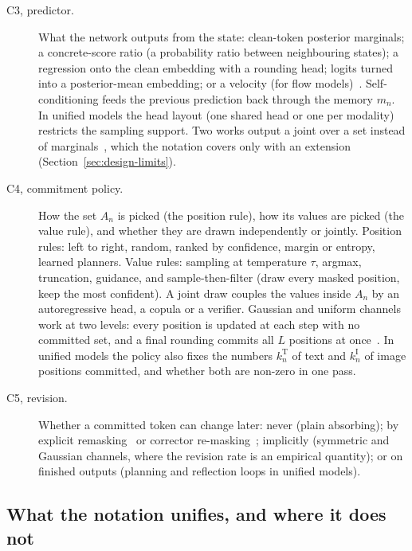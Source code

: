 \begin{description}
  \item[C3, predictor.] What the network outputs from the state: clean-token posterior marginals; a concrete-score ratio (a probability ratio between neighbouring states); a regression onto the clean embedding with a rounding head; logits turned into a posterior-mean embedding; or a velocity (for flow models)~\cite{arXiv:2310.16834,arXiv:2205.14217,arXiv:2305.18619,arXiv:2407.15595}. Self-conditioning feeds the previous prediction back through the memory $m_n$. In unified models the head layout (one shared head or one per modality) restricts the sampling support. Two works output a joint over a set instead of marginals~\cite{arXiv:2410.08709,arXiv:2410.01949}, which the notation covers only with an extension (Section~\ref{sec:design-limits}). %
  \item[C4, commitment policy.] How the set $A_n$ is picked (the position rule), how its values are picked (the value rule), and whether they are drawn independently or jointly. Position rules: left to right, random, ranked by confidence, margin or entropy, learned planners. Value rules: sampling at temperature $\tau$, argmax, truncation, guidance, and sample-then-filter (draw every masked position, keep the most confident). A joint draw couples the values inside $A_n$ by an autoregressive head, a copula or a verifier. Gaussian and uniform channels work at two levels: every position is updated at each step with no committed set, and a final rounding commits all $L$ positions at once~\cite{arXiv:2205.14217,arXiv:2211.15089,arXiv:2305.18619}. In unified models the policy also fixes the numbers $k_n^{\mathrm{T}}$ of text and $k_n^{\mathrm{I}}$ of image positions committed, and whether both are non-zero in one pass. %
  \item[C5, revision.] Whether a committed token can change later: never (plain absorbing); by explicit remasking~\cite{arXiv:2503.00307} or corrector re-masking~\cite{arXiv:2407.15595}; implicitly (symmetric and Gaussian channels, where the revision rate is an empirical quantity); or on finished outputs (planning and reflection loops in unified models). %
\end{description}

\subsection{What the notation unifies, and where it does not}
\label{sec:notation-unify}

